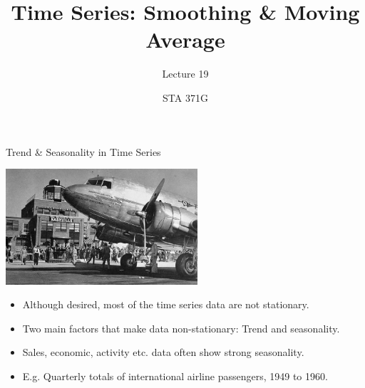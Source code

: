 \documentclass{beamer}\usepackage[]{graphicx}\usepackage[]{color}
\title{Time Series: Smoothing \& Moving Average}
\subtitle{Lecture 19}
\author{STA 371G}
\begin{document}
  
  

  \frame{\maketitle}



  \begin{darkframes}
    
    \begin{frame}{Trend \& Seasonality in Time Series}
      \fontsize{9}{9 }\selectfont
      \begin{center}
        \includegraphics[width=2.8in]{nashville} \\
      \end{center} 
      
      \begin{itemize}[<+->]
        \item Although desired, most of the time series data are not stationary.
        \item Two main factors that make data non-stationary: Trend and seasonality.
        \item Sales, economic, activity etc. data often show strong seasonality.
        \item E.g. Quarterly totals of international airline passengers, 1949 to 1960.
      \end{itemize}
      
    \end{frame}
    
    
 
    
    

\end{darkframes}
\end{document}
